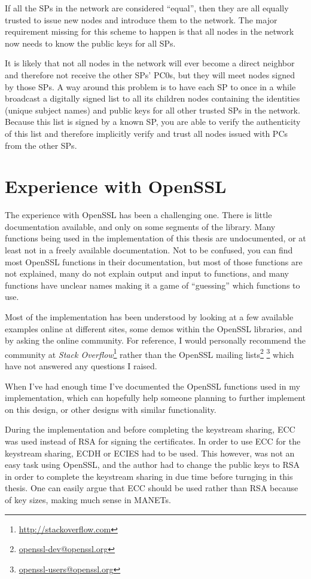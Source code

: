 If all the \acp{SP} in the network are considered ``equal'', then they are all
equally trusted to issue new nodes and introduce them to the network. The major
requirement missing for this scheme to happen is that all nodes in the network
now needs to know the public keys for all SPs.

It is likely that not all nodes in the network will ever become a direct
neighbor and therefore not receive the other SPs' \acp{PC0}, but they will meet
nodes signed by those SPs. A way around this problem is to have each \ac{SP} to
once in a while broadcast a digitally signed list to all its children nodes
containing the identities (unique subject names) and public keys for all other
trusted \acp{SP} in the network. Because this list is signed by a known
\ac{SP}, you are able to verify the authenticity of this list and therefore
implicitly verify and trust all nodes issued with PCs from the other SPs.

\section{Experience with OpenSSL}
The experience with OpenSSL has been a challenging one. There is little
documentation available, and only on some segments of the library. Many
functions being used in the implementation of this thesis are undocumented, or
at least not in a freely available documentation. Not to be confused, you can
find most OpenSSL functions in their documentation, but most of those functions
are not explained, many do not explain output and input to functions, and many
functions have unclear names making it a game of ``guessing'' which functions to
use.

Most of the implementation has been understood by looking at a few available
examples online at different sites, some demos within the OpenSSL libraries,
and by asking the online community. For reference, I would personally recommend the
community at \emph{Stack Overflow}\footnote{\url{http://stackoverflow.com}}
rather than the OpenSSL mailing lists\footnote{\url{openssl-dev@openssl.org}}
\footnote{\url{openssl-users@openssl.org}} which have not answered any
questions I raised.

When I've had enough time I've documented the OpenSSL functions used in my
implementation, which can hopefully help someone planning to further implement
on this design, or other designs with similar functionality.

During the implementation and before completing the keystream sharing, ECC was
used instead of RSA for signing the certificates. In order to use ECC for the
keystream sharing, ECDH or ECIES had to be used. This however, was not an easy
task using OpenSSL, and the author had to change the public keys to RSA in order
to complete the keystream sharing in due time before turnging in this thesis.
One can easily argue that ECC should be used rather than RSA because of key sizes,
making much sense in \acp{MANET}.

